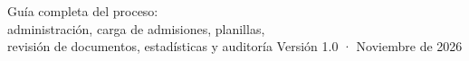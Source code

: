 \documentclass[11pt,letterpaper,oneside]{report}
\begin{document}
  {Guía completa del proceso:\\administración, carga de admisiones, planillas,\\revisión de documentos, estadísticas y auditoría}
  {Versión 1.0 · Noviembre de 2026}

\tableofcontents









\end{document}
